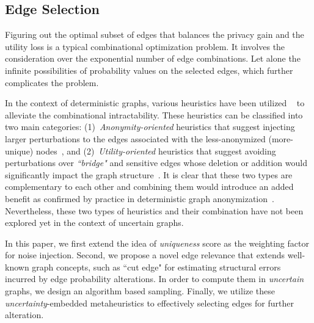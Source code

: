 \subsection{Edge Selection}
Figuring out the optimal subset of edges that balances the privacy gain and the utility loss is a typical combinational optimization problem. It involves the consideration over the exponential number of edge combinations. Let alone the infinite possibilities of probability values on the selected edges, which further complicates the problem.

In the context of deterministic graphs, various heuristics have been utilized ~\cite{Ying2009, casasprivacy, Ying_Randomizing_2008} to alleviate the combinational intractability. 
These heuristics can be classified into two main categories: 
(1)~{\em Anonymity-oriented} heuristics that suggest injecting larger perturbations to the edges associated with the less-anonymized (more-unique) 
nodes~\cite{Boldi_Injecting_2012,Ying2009,Liu_Towards_2008, Thompson_The_2009,Zhou_Preserving_2008,casasprivacy,Ying_Randomizing_2008,Wang2011,Das_Anonymizing_2010,Wu_k_2010,Liu_Privacy_2009,Ninggal_Utility_2015}, and 
(2)~{\em Utility-oriented} heuristics that suggest avoiding perturbations over {\em ``bridge"} and sensitive edges whose deletion or addition would 
significantly impact the graph structure~\cite{casasprivacy,Ying_Randomizing_2008,Wang2011,Das_Anonymizing_2010,Wu_k_2010,Liu_Privacy_2009,Ninggal_Utility_2015}.
It is clear that these two types are complementary to each other and combining them would introduce an added benefit as confirmed by practice in deterministic graph anonymization~\cite{casasprivacy}. Nevertheless, these two types of heuristics and their combination have not been explored yet in the context of uncertain graphs.

In this paper, we first extend the idea of \emph{uniqueness} score as the weighting factor for noise injection. Second, we propose a novel edge relevance that extends well-known graph concepts, such as ``cut edge" for estimating structural errors incurred by edge probability alterations. In order to compute them in \emph{uncertain} graphs, we design an algorithm based sampling. Finally, we utilize these \emph{uncertainty}-embedded metaheuristics to effectively selecting edges for further alteration. 




